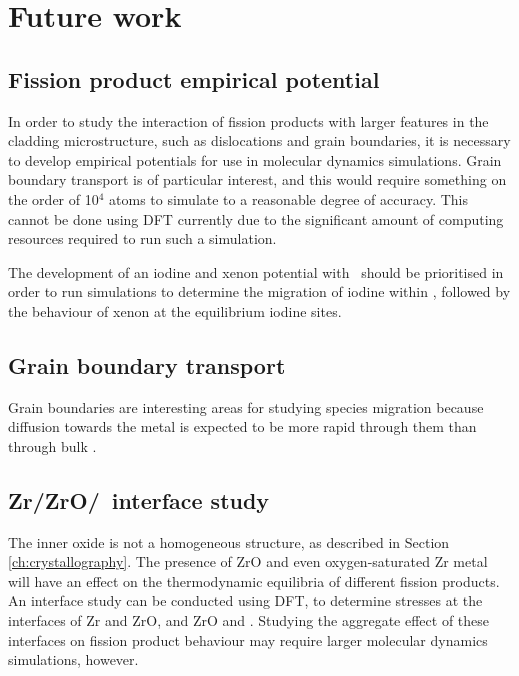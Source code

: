 \chapter{Future work}

\label{ch:future}

\section{Fission product empirical potential}

In order to study the interaction of fission products with larger features in the cladding microstructure, such as dislocations and grain boundaries, it is necessary to develop empirical potentials for use in molecular dynamics simulations. Grain boundary transport is of particular interest, and this would require something on the order of 10$^{4}$ atoms to simulate to a reasonable degree of accuracy. This cannot be done using DFT currently due to the significant amount of computing resources required to run such a simulation. 

The development of an iodine and xenon potential with \zirconia\ should be prioritised in order to run simulations to determine the migration of iodine within \zirconia, followed by the behaviour of xenon at the equilibrium iodine sites.

\section{Grain boundary transport}

Grain boundaries are interesting areas for studying species migration because diffusion towards the metal is expected to be more rapid through them than through bulk \zirconia .

\section{Zr/ZrO/\zirconia\ interface study}

The inner oxide is not a homogeneous structure, as described in Section \ref{ch:crystallography}. The presence of ZrO and even oxygen-saturated Zr metal will have an effect on the thermodynamic equilibria of different fission products. An interface study can be conducted using DFT, to determine stresses at the interfaces of Zr and ZrO, and ZrO and \zirconia . Studying the aggregate effect of these interfaces on fission product behaviour may require larger molecular dynamics simulations, however.